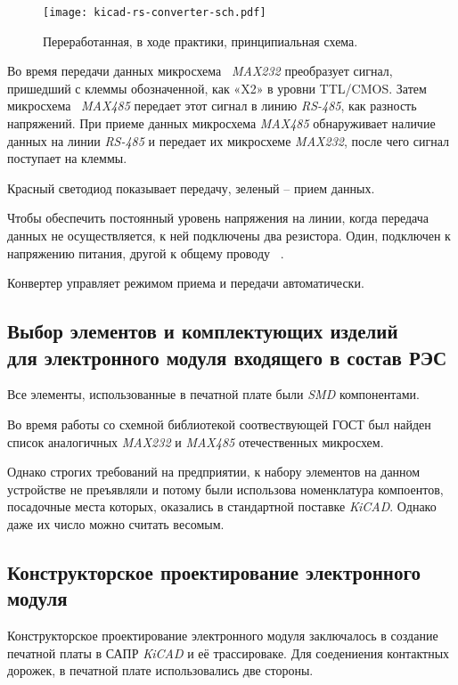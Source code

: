 \begin{figure}[H]
  \centering
  \texttt{[image: kicad-rs-converter-sch.pdf]}
  \caption{Переработанная, в ходе практики, принципиальная схема.}
\end{figure}


Во время передачи данных микросхема ~\textit{MAX232} преобразует сигнал,
пришедший с клеммы обозначенной,
как «X2» в уровни TTL/CMOS.
Затем микросхема ~\textit{MAX485}
передает этот сигнал в линию \textit{RS-485}, как разность напряжений.
При приеме данных микросхема \textit{MAX485} обнаруживает наличие данных
на линии \textit{RS-485} и передает их микросхеме \textit{MAX232},
после чего сигнал поступает на клеммы.

Красный светодиод показывает передачу,
зеленый – прием данных.

Чтобы обеспечить постоянный уровень напряжения на линии,
когда передача данных не осуществляется,
к ней подключены два резистора.
Один, подключен к напряжению питания, другой к общему проводу ~\cite{rlocman-rs-converter}.

Конвертер управляет режимом приема и передачи автоматически.

\subsection{Выбор элементов и комплектующих изделий\\
  для электронного модуля входящего в состав РЭС}

Все элементы, использованные в печатной плате были \textit{SMD}
компонентами.

Во время работы со схемной библиотекой соотвествующей ГОСТ
был найден список аналогичных \textit{MAX232} и \textit{MAX485} отечественных
микросхем.


Однако строгих требований на предприятии,
к набору элементов на данном устройстве не преъявляли
и потому были использова номенклатура компоентов,
посадочные места которых,
оказались в стандартной поставке \textit{KiCAD}.
Однако даже их число можно считать весомым.


\subsection{Конструкторское проектирование электронного модуля}

Конструкторское проектирование электронного модуля заключалось в
создание печатной платы в САПР \textit{KiCAD} и её трассироваке.
Для соедениения контактных дорожек,
в печатной плате использовались две стороны.

